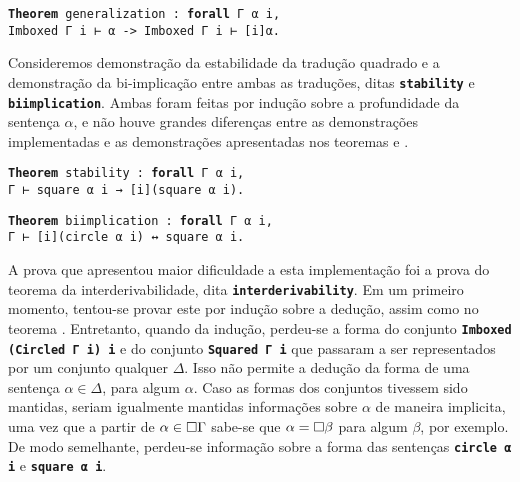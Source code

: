 \vspace{0.5\baselineskip}
\begin{tcolorbox}[enhanced jigsaw, breakable, sharp corners, colframe=black, colback=white, boxrule=0.5pt, left=1.5mm, right=1.5mm, top=1.5mm, bottom=1.5mm]
\texttt{\noindent\footnotesize\textbf{Theorem} generalization : \textbf{forall} Γ α i,\\Imboxed Γ i ⊢ α -> Imboxed Γ i ⊢ [i]α.}
\end{tcolorbox}

\vspace{0.5\baselineskip}
Consideremos demonstração da estabilidade da tradução quadrado e a demonstração da bi-implicação entre ambas as traduções, ditas \texttt{\noindent\footnotesize\textbf{stability}} e \texttt{\noindent\footnotesize\textbf{biimplication}}.
Ambas foram feitas por indução sobre a profundidade da sentença $\alpha$, e não houve grandes diferenças entre as demonstrações implementadas e as demonstrações apresentadas nos teoremas  e .

\vspace{0.5\baselineskip}
\begin{tcolorbox}[enhanced jigsaw, breakable, sharp corners, colframe=black, colback=white, boxrule=0.5pt, left=1.5mm, right=1.5mm, top=1.5mm, bottom=1.5mm]
\texttt{\noindent\footnotesize\textbf{Theorem} stability : \textbf{forall} Γ α i,\\Γ ⊢ square α i → [i](square α i).}
\end{tcolorbox}

\begin{tcolorbox}[enhanced jigsaw, breakable, sharp corners, colframe=black, colback=white, boxrule=0.5pt, left=1.5mm, right=1.5mm, top=1.5mm, bottom=1.5mm]
\texttt{\noindent\footnotesize\textbf{Theorem} biimplication : \textbf{forall} Γ α i,\\Γ ⊢ [i](circle α i) ↔ square α i.}
\end{tcolorbox}

\vspace{.5\baselineskip}
A prova que apresentou maior dificuldade a esta implementação foi a prova do teorema da interderivabilidade, dita \texttt{\noindent\footnotesize\textbf{interderivability}}.
Em um primeiro momento, tentou-se provar este por indução sobre a dedução, assim como no teorema .
Entretanto, quando da indução, perdeu-se a forma do conjunto \texttt{\noindent\footnotesize\textbf{Imboxed (Circled Γ i) i}} e do conjunto \texttt{\noindent\footnotesize\textbf{Squared Γ i}} que passaram a ser representados por um conjunto qualquer $\Delta$.
Isso não permite a dedução da forma de uma sentença $\alpha\in\Delta$, para algum $\alpha$.
Caso as formas dos conjuntos tivessem sido mantidas, seriam igualmente mantidas informações sobre $\alpha$ de maneira implicita, uma vez que a partir de $\alpha\in\Box\Gamma$ sabe-se que $\alpha=\Box\beta$ para algum $\beta$, por exemplo.
De modo semelhante, perdeu-se informação sobre a forma das sentenças \texttt{\noindent\footnotesize\textbf{circle α i}} e \texttt{\noindent\footnotesize\textbf{square α i}}.

